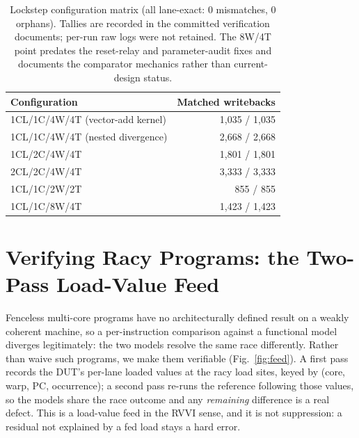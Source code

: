\documentclass[conference]{IEEEtran}
\begin{document}
\begin{table}[t]
	\caption{Lockstep configuration matrix (all lane-exact: 0 mismatches,
		0 orphans). Tallies are recorded in the committed verification
		documents; per-run raw logs were not retained. The 8W/4T point
		predates the reset-relay and parameter-audit fixes and documents
		the comparator mechanics rather than current-design status.}
	\label{tab:matrix}
	\centering
	\small
	\begin{tabular}{lr}
		\toprule
		Configuration                    & Matched writebacks \\
		\midrule
		1CL/1C/4W/4T (vector-add kernel) & 1{,}035 / 1{,}035  \\
		1CL/1C/4W/4T (nested divergence) & 2{,}668 / 2{,}668  \\
		1CL/2C/4W/4T                     & 1{,}801 / 1{,}801  \\
		2CL/2C/4W/4T                     & 3{,}333 / 3{,}333  \\
		1CL/1C/2W/2T                     & 855 / 855          \\
		1CL/1C/8W/4T                     & 1{,}423 / 1{,}423  \\
		\bottomrule
	\end{tabular}
\end{table}

\section{Verifying Racy Programs: the Two-Pass Load-Value Feed}
\label{sec:loadfeed}

Fenceless multi-core programs have no architecturally defined result on
a weakly coherent machine, so a per-instruction comparison against a
functional model diverges legitimately: the two models resolve the same
race differently. Rather than waive such programs, we make them
verifiable (Fig.~\ref{fig:feed}). A first pass records the DUT's
per-lane loaded values at the
racy load sites, keyed by (core, warp, PC, occurrence); a second pass
re-runs the reference following those values, so the models share the
race outcome and any \emph{remaining} difference is a real defect. This
is a load-value feed in the RVVI sense, and it is not suppression: a
residual not explained by a fed load stays a hard error.
\end{document}
